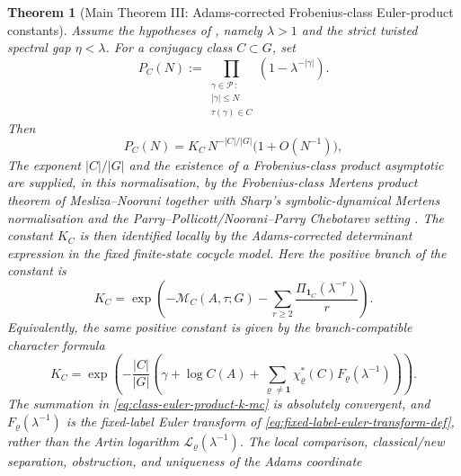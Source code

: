 \documentclass[11pt,a4paper]{amsart}
\theoremstyle{plain}
\newtheorem{theorem}{Theorem}[section]
\theoremstyle{definition}
\theoremstyle{remark}
\newcommand{\cP}{\mathcal P}
\begin{document}
\begin{theorem}[Main Theorem III: Adams-corrected Frobenius-class
  Euler-product constants]
  \label{thm:class-euler-product-mertens}
  Assume the hypotheses of , namely
  \(\lambda>1\) and the strict twisted spectral gap \(\eta<\lambda\). For a
  conjugacy class \(C\subset G\), set
  \begin{equation}\label{eq:class-euler-product-def}
    P_C(N):=
    \prod_{\substack{\gamma\in\cP\,:\\ |\gamma|\le N\\
      \tau(\gamma)\in C}}
      \left(1-\lambda^{-|\gamma|}\right).
  \end{equation}
  Then
  \begin{equation}\label{eq:class-euler-product-asymptotic}
    P_C(N)=K_C\,N^{-|C|/|G|}\bigl(1+O(N^{-1})\bigr),
  \end{equation}
  The exponent \(|C|/|G|\) and the existence of a Frobenius-class product
  asymptotic are supplied, in this normalisation, by the Frobenius-class
  Mertens product theorem of Mesliza--Noorani together with Sharp's
  symbolic-dynamical Mertens normalisation and the Parry--Pollicott/Noorani--Parry
  Chebotarev setting
  \cite{MeslizaNoorani1999FrobeniusMertens,Sharp1991Mertens,ParryPollicott1986Chebotarev,NooraniParry1992ChebotarevShifts}.
  The constant \(K_C\) is then identified locally by the Adams-corrected
  determinant expression in the fixed finite-state cocycle model.
  Here the positive branch of the constant is
  \begin{equation}\label{eq:class-euler-product-k-mc}
    K_C=
    \exp\!\left(
      -\mathcal M_C(A,\tau;G)
      -\sum_{r\ge2}\frac{\Pi_{\mathbf1_C}(\lambda^{-r})}{r}
    \right).
  \end{equation}
  Equivalently, the same positive constant is given by the branch-compatible
  character formula
  \begin{equation}\label{eq:class-euler-product-k-f}
    K_C=
    \exp\!\left(
      -\frac{|C|}{|G|}
      \left(
        \gamma+\log C(A)
        +\sum_{\varrho\neq\mathbf1}
          \chi_\varrho^\ast(C)F_\varrho(\lambda^{-1})
      \right)
    \right).
  \end{equation}
  The summation in \eqref{eq:class-euler-product-k-mc} is absolutely
  convergent, and \(F_\varrho(\lambda^{-1})\) is the fixed-label Euler
  transform of \eqref{eq:fixed-label-euler-transform-def}, rather than the
  Artin logarithm \(\mathcal L_\varrho(\lambda^{-1})\).  The local comparison,
  classical/new separation, obstruction, and uniqueness of the Adams coordinate

\end{theorem}
\end{document}
